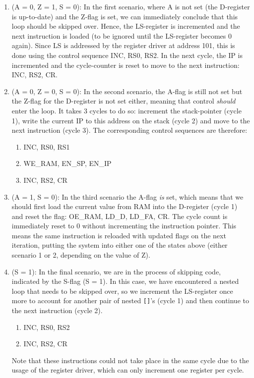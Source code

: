   \begin{enumerate}
  \item (A = 0, Z = 1, S = 0): In the first scenario, where A is not set (the D-register is up-to-date) and the Z-flag is set, we can immediately conclude that this loop should be skipped over. Hence, the LS-register is incremented and the next instruction is loaded (to be ignored until the LS-register becomes 0 again). Since LS is addressed by the register driver at address 101, this is done using the control sequence INC, RS0, RS2. In the next cycle, the IP is incremented and the cycle-counter is reset to move to the next instruction: INC, RS2, CR.

  \item (A = 0, Z = 0, S = 0): In the second scenario, the A-flag is still not set but the Z-flag for the D-register is not set either, meaning that control \emph{should} enter the loop. It takes 3 cycles to do so: increment the stack-pointer (cycle 1), write the current IP to this address on the stack (cycle 2) and move to the next instruction (cycle 3). The corresponding control sequences are therefore:
    \begin{enumerate}
    \item INC, RS0, RS1
    \item WE\_RAM, EN\_SP, EN\_IP
    \item INC, RS2, CR
    \end{enumerate}

  \item (A = 1, S = 0): In the third scenario the A-flag \emph{is} set, which means that we should first load the current value from RAM into the D-register (cycle 1) and reset the flag: OE\_RAM, LD\_D, LD\_FA, CR. The cycle count is immediately reset to 0 without incrementing the instruction pointer. This means the same instruction is reloaded with updated flags on the next iteration, putting the system into either one of the states above (either scenario 1 or 2, depending on the value of Z).

  \item (S = 1): In the final scenario, we are in the process of skipping code, indicated by the S-flag (S = 1). In this case, we have encountered a nested loop that needs to be skipped over, so we increment the LS-register once more to account for another pair of nested \texttt{[]}'s (cycle 1) and then continue to the next instruction (cycle 2).
    \begin{enumerate}
    \item INC, RS0, RS2
    \item INC, RS2, CR
    \end{enumerate}
    Note that these instructions could not take place in the same cycle due to the usage of the register driver, which can only increment one register per cycle.
  \end{enumerate}


